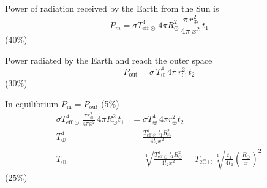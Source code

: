 Power of radiation received by the Earth from the Sun is
\[
P_m = \sigma T_{\mathrm{eff}\,\odot}^{4}\, 4\pi R_\odot^2\,
      \frac{\pi\, r_\oplus^2}{4\pi\, x^2}\, t_1
\]
\hfill(40\%)

Power radiated by the Earth and reach the outer space
\[
P_{\mathrm{out}} = \sigma\, T_\oplus^4\, 4\pi\, r_\oplus^2\, t_2
\]
\hfill(30\%)

In equilibrium $P_{\mathrm{in}} = P_{\mathrm{out}}$ \hfill(5\%)
\begin{align*}
\sigma T_{\mathrm{eff}\,\odot}^4\,\frac{\pi r_\oplus^2}{4\pi x^2}\,
  4\pi R_\odot^2 t_1 &= \sigma T_\oplus^4\, 4\pi r_\oplus^2 t_2\\
T_\oplus^4 &= \frac{T_{\mathrm{eff}\,\odot}^4\, t_1 R_\odot^2}{4 t_2 x^2}\\
T_\oplus &= \sqrt[4]{\frac{T_{\mathrm{eff}\,\odot}^4\, t_1 R_\odot^2}
                          {4 t_2 x^2}}
          = T_{\mathrm{eff}\,\odot}
            \sqrt[4]{\frac{t_1}{4 t_2}\left(\frac{R_\odot}{x}\right)^2}
\end{align*}
\hfill(25\%)

